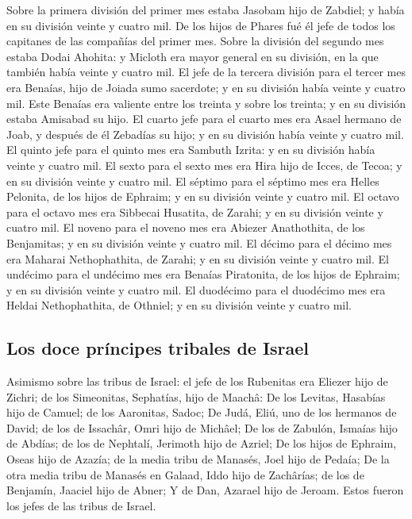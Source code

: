  Sobre la primera división del primer mes estaba Jasobam
hijo de Zabdiel; y había en su división veinte y cuatro mil.
 De los hijos de Phares fué él jefe de todos los capitanes
de las compañías del primer mes.  Sobre la división del
segundo mes estaba Dodai Ahohita: y Micloth era mayor general en su
división, en la que también había veinte y cuatro mil.  El
jefe de la tercera división para el tercer mes era Benaías, hijo de
Joiada sumo sacerdote; y en su división había veinte y cuatro mil.
 Este Benaías era valiente entre los treinta y sobre los
treinta; y en su división estaba Amisabad su hijo.  El
cuarto jefe para el cuarto mes era Asael hermano de Joab, y después de
él Zebadías su hijo; y en su división había veinte y cuatro mil.
 El quinto jefe para el quinto mes era Sambuth Izrita: y en
su división había veinte y cuatro mil.  El sexto para el
sexto mes era Hira hijo de Icces, de Tecoa; y en su división veinte y
cuatro mil.  El séptimo para el séptimo mes era Helles
Pelonita, de los hijos de Ephraim; y en su división veinte y cuatro mil.
 El octavo para el octavo mes era Sibbecai Husatita, de
Zarahi; y en su división veinte y cuatro mil.  El noveno
para el noveno mes era Abiezer Anathothita, de los Benjamitas; y en su
división veinte y cuatro mil.  El décimo para el décimo mes
era Maharai Nethophathita, de Zarahi; y en su división veinte y cuatro
mil.  El undécimo para el undécimo mes era Benaías
Piratonita, de los hijos de Ephraim; y en su división veinte y cuatro
mil.  El duodécimo para el duodécimo mes era Heldai
Nethophathita, de Othniel; y en su división veinte y cuatro mil.

\hypertarget{los-doce-pruxedncipes-tribales-de-israel}{%
\subsection{Los doce príncipes tribales de
Israel}\label{los-doce-pruxedncipes-tribales-de-israel}}

 Asimismo sobre las tribus de Israel: el jefe de los
Rubenitas era Eliezer hijo de Zichri; de los Simeonitas, Sephatías, hijo
de Maachâ:  De los Levitas, Hasabías hijo de Camuel; de los
Aaronitas, Sadoc;  De Judá, Eliú, uno de los hermanos de
David; de los de Issachâr, Omri hijo de Michâel;  De los de
Zabulón, Ismaías hijo de Abdías; de los de Nephtalí, Jerimoth hijo de
Azriel;  De los hijos de Ephraim, Oseas hijo de Azazía; de
la media tribu de Manasés, Joel hijo de Pedaía;  De la otra
media tribu de Manasés en Galaad, Iddo hijo de Zachârías; de los de
Benjamín, Jaaciel hijo de Abner;  Y de Dan, Azarael hijo de
Jeroam. Estos fueron los jefes de las tribus de Israel.


